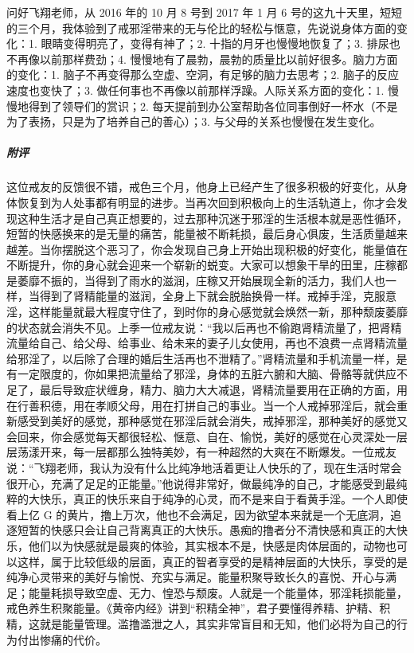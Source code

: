 \begin{case}
    问好飞翔老师，从 2016 年的 10 月 8 号到 2017 年 1 月 6 号的这九十天里，短短的三个月，我体验到了戒邪淫带来的无与伦比的轻松与惬意，先说说身体方面的变化：1. 眼睛变得明亮了，变得有神了；2. 十指的月牙也慢慢地恢复了；3. 排尿也不再像以前那样费劲；4. 慢慢地有了晨勃，晨勃的质量比以前好很多。脑力方面的变化：1. 脑子不再变得那么空虚、空洞，有足够的脑力去思考；2. 脑子的反应速度也变快了；3. 做任何事也不再像以前那样浮躁。人际关系方面的变化：1. 慢慢地得到了领导们的赏识；2. 每天提前到办公室帮助各位同事倒好一杯水（不是为了表扬，只是为了培养自己的善心）；3. 与父母的关系也慢慢在发生变化。
    \subparagraph{附评} 这位戒友的反馈很不错，戒色三个月，他身上已经产生了很多积极的好变化，从身体恢复到为人处事都有明显的进步。当再次回到积极向上的生活轨道上，你才会发现这种生活才是自己真正想要的，过去那种沉迷于邪淫的生活根本就是恶性循环，短暂的快感换来的是无量的痛苦，能量被不断耗损，最后身心俱废，生活质量越来越差。当你摆脱这个恶习了，你会发现自己身上开始出现积极的好变化，能量值在不断提升，你的身心就会迎来一个崭新的蜕变。大家可以想象干旱的田里，庄稼都是萎靡不振的，当得到了雨水的滋润，庄稼又开始展现全新的活力，我们人也一样，当得到了肾精能量的滋润，全身上下就会脱胎换骨一样。戒掉手淫，克服意淫，这样能量就最大程度守住了，到时你的身心感觉就会焕然一新，那种颓废萎靡的状态就会消失不见。上季一位戒友说：“我以后再也不偷跑肾精流量了，把肾精流量给自己、给父母、给事业、给未来的妻子儿女使用，再也不浪费一点肾精流量给邪淫了，以后除了合理的婚后生活再也不泄精了。”肾精流量和手机流量一样，是有一定限度的，你如果把流量给了邪淫，身体的五脏六腑和大脑、骨骼等就供应不足了，最后导致症状缠身，精力、脑力大大减退，肾精流量要用在正确的方面，用在行善积德，用在孝顺父母，用在打拼自己的事业。当一个人戒掉邪淫后，就会重新感受到美好的感觉，那种感觉在邪淫后就会消失，戒掉邪淫，那种美好的感觉又会回来，你会感觉每天都很轻松、惬意、自在、愉悦，美好的感觉在心灵深处一层层荡漾开来，每一层都那么独特美妙，有一种超然的大爽在不断爆发。一位戒友说：“飞翔老师，我认为没有什么比纯净地活着更让人快乐的了，现在生活时常会很开心，充满了足足的正能量。”他说得非常好，做最纯净的自己，才能感受到最纯粹的大快乐，真正的快乐来自于纯净的心灵，而不是来自于看黄手淫。一个人即使看上亿 G 的黄片，撸上万次，他也不会满足，因为欲望本来就是一个无底洞，追逐短暂的快感只会让自己背离真正的大快乐。愚痴的撸者分不清快感和真正的大快乐，他们以为快感就是最爽的体验，其实根本不是，快感是肉体层面的，动物也可以这样，属于比较低级的层面，真正的智者享受的是精神层面的大快乐，享受的是纯净心灵带来的美好与愉悦、充实与满足。能量积聚导致长久的喜悦、开心与满足；能量耗损导致空虚、无力、惶恐与颓废。人就是一个能量体，邪淫耗损能量，戒色养生积聚能量。《黄帝内经》讲到“积精全神”，君子要懂得养精、护精、积精，这就是能量管理。滥撸滥泄之人，其实非常盲目和无知，他们必将为自己的行为付出惨痛的代价。
\end{case}

